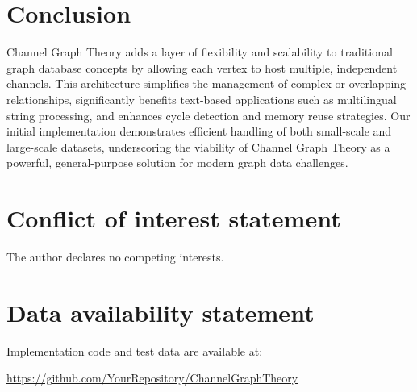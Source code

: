 \documentclass[12pt, a4paper]{article}
\begin{document}
\section{Conclusion}\label{Sec:Conclusion}
Channel Graph Theory adds a layer of flexibility and scalability to traditional graph database concepts by allowing each vertex to host multiple, independent channels. This architecture simplifies the management of complex or overlapping relationships, significantly benefits text-based applications such as multilingual string processing, and enhances cycle detection and memory reuse strategies. Our initial implementation demonstrates efficient handling of both small-scale and large-scale datasets, underscoring the viability of Channel Graph Theory as a powerful, general-purpose solution for modern graph data challenges.

\section*{Conflict of interest statement}
The author declares no competing interests.

\section*{Data availability statement}
Implementation code and test data are available at:
\begin{center}
\url{https://github.com/YourRepository/ChannelGraphTheory}
\end{center}



\end{document}
